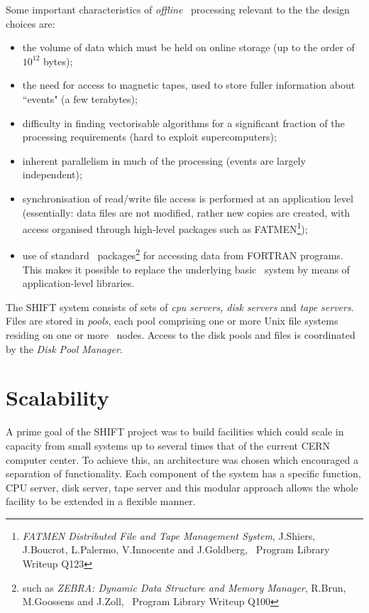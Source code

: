 Some important characteristics of {\em offline} \HEP\ processing relevant to the
the design choices are:
\begin{itemize}
\item the volume of data which must be held on online storage (up to the order
 of \(10^{12}\) bytes);
\item the need for access to magnetic tapes, used to store fuller information
about ``events" (a few terabytes);
\item difficulty in finding vectorisable algorithms for a significant
fraction of the processing requirements (hard to exploit supercomputers);
\item inherent parallelism in much of the processing (events are largely
independent);
\item synchronisation of read/write file access is performed at an application
 level
(essentially: data files are not modified, rather new copies are created,
with access organised through high-level packages such as FATMEN\footnote{{\it
 FATMEN
Distributed File and Tape Management System}, J.Shiers, J.Boucrot, L.Palermo,
V.Innocente and J.Goldberg, \CERN\ Program Library Writeup Q123});
\item use of standard \HEP\ packages\footnote{such as {\it ZEBRA: Dynamic Data
 Structure
and Memory Manager}, R.Brun, M.Goossens and J.Zoll, \CERN\ Program Library
 Writeup Q100}
for accessing data from FORTRAN programs. This makes it possible to replace the
 underlying
basic \IO\ system by means of application-level libraries.
\end{itemize}
 
 
The SHIFT system consists of sets of
{\it cpu servers, disk servers} and {\it tape servers}.
Files are stored in {\it pools}, each pool
comprising one or more Unix
file systems residing on one or more \shift\ nodes.
Access to the disk pools and files is coordinated by the {\it Disk Pool
 Manager}.
 
 
\section {Scalability}
 
A prime goal of the SHIFT project was to build facilities which could scale
in capacity from small systems up to several times that of the
current CERN computer center.
To achieve this, an architecture was chosen which encouraged a separation of
functionality.
Each component of the system has a specific function, CPU server,
disk server, tape server and this modular approach allows the whole facility
to be extended in a flexible manner.
 
